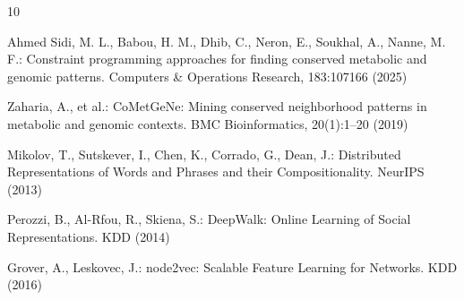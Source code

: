 \documentclass{llncs}
\begin{document}
\begin{thebibliography}{10}

Ahmed Sidi, M. L., Babou, H. M., Dhib, C., Neron, E., Soukhal, A., Nanne, M. F.:
Constraint programming approaches for finding conserved metabolic and genomic patterns.
Computers \& Operations Research, 183:107166 (2025)

Zaharia, A., et al.:
CoMetGeNe: Mining conserved neighborhood patterns in metabolic and genomic contexts.
BMC Bioinformatics, 20(1):1--20 (2019)

Mikolov, T., Sutskever, I., Chen, K., Corrado, G., Dean, J.:
Distributed Representations of Words and Phrases and their Compositionality.
NeurIPS (2013)

Perozzi, B., Al-Rfou, R., Skiena, S.:
DeepWalk: Online Learning of Social Representations.
KDD (2014)

Grover, A., Leskovec, J.:
node2vec: Scalable Feature Learning for Networks.
KDD (2016)

\end{thebibliography}
\end{document}
